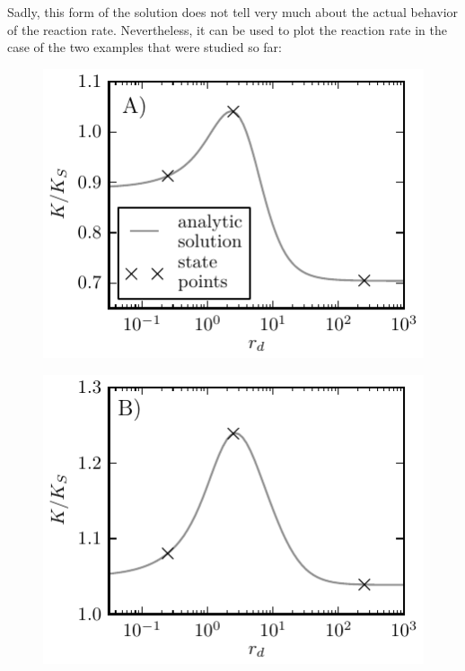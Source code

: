 Sadly, this form of the solution does not tell very much about the actual behavior of the reaction rate. Nevertheless, it can be used to plot the reaction rate in the case of the two examples that were studied so far: \\
\begin{minipage}[t]{0.5 \textwidth}
    \begin{figure}[H]
        \includegraphics[width = 1 \textwidth]{plots/rb_rate.pdf}
    \end{figure}
\end{minipage}\begin{minipage}[t]{0.5 \textwidth}
    \begin{figure}[H]
        \includegraphics[width = 1 \textwidth]{plots/ab_rate.pdf}
    \end{figure}
\end{minipage}

